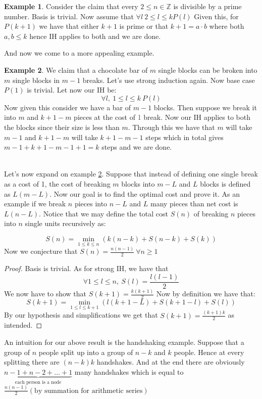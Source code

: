 \documentclass[titlepage]{article}
\theoremstyle{definition}
\newtheorem{example}{Example}
\numberwithin{equation}{subsection}
\numberwithin{remark}{subsection}
\begin{document}
\begin{example}
Consider the claim that every $ 2 \leq n\in \mathbb{Z}$ is divisible by a prime number. Basis is trivial. Now assume that $\forall l \ 2 \leq l \leq k P(l)$ Given this, for $P(k+1)$ we have that either $k+1$ is prime or that $k+1 = a\cdot b$ where both $a,b \leq k$ hence IH applies to both and we are done. 
\end{example}

And now we come to a more appealing example. 

\begin{example}
\label{exC}
We claim that a chocolate bar of $m$ single blocks can be broken into $m$ single blocks in $m-1$ breaks. Let's use strong induction again. Now base case $P(1)$ is trivial. Let now our IH be:
$$ \forall l, \ 1\leq l \leq k \ P(l)$$ Now given this consider we have a bar of $m-1$ blocks. Then suppose we break it into $m$ and $k+1 - m$ pieces at the cost of \textcolor{red}{1} break. Now our IH applies to both the blocks since their size is less than $m$. Through this we have that $m$ will take $m-1$ and $k+1-m$ will take $k+1-m-1$ steps which in total gives $m-1 + k+1-m-1 + 1 = k$ steps and we are done. 
\end{example}
\\ 
Let's now expand on example \ref{exC}. Suppose that instead of defining one single break as a cost of 1, the cost of breaking $m$ blocks into $m-L$ and $L$ blocks is defined as $L(m-L)$. Now our goal is to find the optimal cost and prove it. As an example if we break $n$ pieces into $n-L$ and $L$ many pieces than net cost is $L(n-L)$. Notice that we may define the total cost $S(n)$ of breaking $n$ pieces into $n$ single units recursively as:

$$ S(n) = \min_{1\leq k \leq n}(k(n-k) + S(n-k) + S(k))$$
Now we conjecture that $S(n) = \frac{n(n-1)}{2} \ \forall n \geq 1$

\begin{proof}
Basis is trivial. As for strong IH, we have that $$ \forall 1 \leq l \leq n, \ S(l) = \frac{l(l-1)}{2} $$ We now have to show that $S(k+1) = \frac{k(k+1)}{2}$ Now by definition we have that:
$$ S(k+1) = \min_{1\leq l \leq k+1}(l(k+1-L) + S(k+1-l) + S(l))$$ By our hypothesis and simplifications we get that $S(k+1) = \frac{(k+1)k}{2}$ as intended. 
\end{proof}

\begin{tcolorbox}[drop shadow, title=(Useful analogy),lower separated=true]
An intuition for our above result is the handshaking example. Suppose that a group of $n$ people split up into a group of $n-k$ and $k$ people. Hence at every splitting there are $(n-k)k$ handshakes. And at the end there are obviously $\underbrace{n-1 + n-2 + \ldots + 1}_{\text{each person is a node}}$ many handshakes which is equal to $\frac{n(n-1)}{2}(\text{by summation for arithmetic series})$
\end{tcolorbox}
\end{document}
